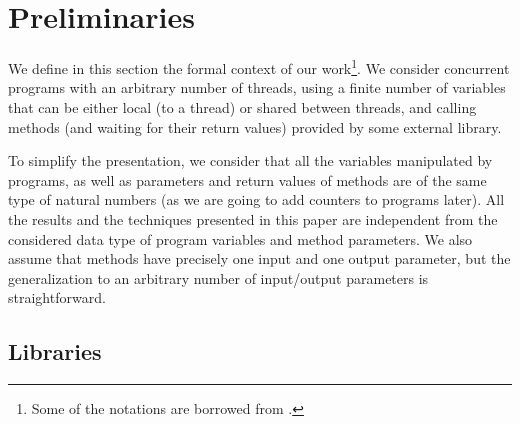 \section{Preliminaries}
\label{sec:prelim}

We define in this section the formal context of our work\footnote{Some of the notations are borrowed from \citet{journals/tcs/FilipovicORY10}.}. We consider concurrent programs with an arbitrary number of threads, using a finite number of variables that can be either local (to a thread) or shared between threads, and calling methods (and waiting for their return values) provided by some external library.

To simplify the presentation, we consider that all the variables manipulated by programs, as well as parameters and return values of methods are of the same type of natural numbers (as we are going to add counters to programs later). All the results and the techniques presented in this paper are independent from the considered data type of program variables and method parameters. We also assume that methods have precisely one input and one output parameter, but the 
generalization to an arbitrary number of input/output parameters is straightforward. 





\subsection{Libraries} 

